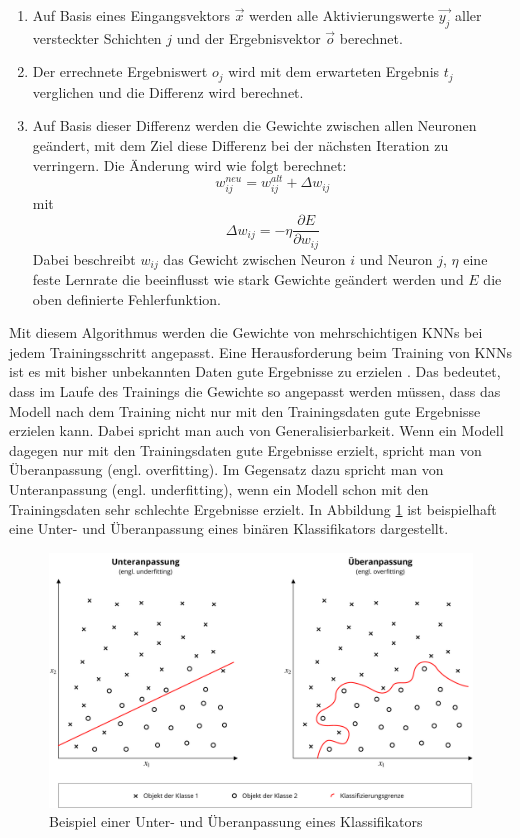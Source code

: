 \begin{enumerate}
\item Auf Basis eines Eingangsvektors $\vec{x}$ werden alle Aktivierungswerte $\vec{y_j}$ aller versteckter Schichten $j$ und der Ergebnisvektor $\vec{o}$ berechnet.
\item Der errechnete Ergebniswert $o_j$ wird mit dem erwarteten Ergebnis $t_j$ verglichen und die Differenz wird berechnet.
\item Auf Basis dieser Differenz werden die Gewichte zwischen allen Neuronen geändert, mit dem Ziel diese Differenz bei der nächsten Iteration zu verringern. Die Änderung wird wie folgt berechnet:
\begin{equation}
w^{neu}_{ij} = w^{alt}_{ij} + \Delta w_{ij}
\end{equation}
mit
\begin{equation}
\Delta w_{ij} = -\eta \frac{\partial E}{\partial w_{ij}}
\end{equation}
Dabei beschreibt $w_{ij}$ das Gewicht zwischen Neuron $i$ und Neuron $j$, $\eta$ eine feste Lernrate die beeinflusst wie stark Gewichte geändert werden und $E$ die oben definierte Fehlerfunktion.
\end{enumerate}

Mit diesem Algorithmus werden die Gewichte von mehrschichtigen \acp{KNN} bei jedem Trainingsschritt angepasst. Eine Herausforderung beim Training von \acp{KNN} ist es mit bisher unbekannten Daten gute Ergebnisse zu erzielen \cite{srivastava2014dropout}. Das bedeutet, dass im Laufe des Trainings die Gewichte so angepasst werden müssen, dass das Modell nach dem Training nicht nur mit den Trainingsdaten gute Ergebnisse erzielen kann. Dabei spricht man auch von Generalisierbarkeit. Wenn ein Modell dagegen nur mit den Trainingsdaten gute Ergebnisse erzielt, spricht man von Überanpassung (engl. overfitting). Im Gegensatz dazu spricht man von Unteranpassung (engl. underfitting), wenn ein Modell schon mit den Trainingsdaten sehr schlechte Ergebnisse erzielt. In Abbildung \ref{fig_overfitting} ist beispielhaft eine Unter- und Überanpassung eines binären Klassifikators dargestellt.

\begin{figure}[h]
\centering
\includegraphics[scale=0.4]{images/overfitting.pdf}
\caption{Beispiel einer Unter- und Überanpassung eines Klassifikators}
\label{fig_overfitting}
\end{figure}

